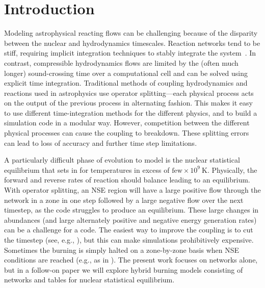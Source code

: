 \documentclass[linenumbers]{aastex631}
\begin{document}

\section{Introduction}\label{Sec:Introduction}

Modeling astrophysical reacting flows can be challenging because of
the disparity between the nuclear and hydrodynamics timescales.
Reaction networks tend to be stiff, requiring implicit integration
techniques to stably integrate the system~\citep{BYRNE19871}.  In contrast, compressible
hydrodynamics flows are limited by the (often much longer)
sound-crossing time over a computational cell and can be solved using
explicit time integration. Traditional methods of coupling
hydrodynamics and reactions used in astrophysics use operator
splitting---each physical process acts on the output of the previous
process in alternating fashion.  This makes it easy to use different
time-integration methods for the different physics, and to build a
simulation code in a modular way.  However, competition between the
different physical processes can cause the coupling to breakdown.
These splitting errors can lead to loss of accuracy and further time
step limitations.

A particularly difficult phase of evolution to model is the nuclear
statistical equilibrium that sets in for temperatures in excess of
$\mbox{few} \times 10^9~\mathrm{K}$.  Physically, the forward and
reverse rates of reaction should balance leading to an equilibrium.
With operator splitting, an NSE region will have a large positive flow
through the network in a zone in one step followed by a large negative
flow over the next timestep, as the code struggles to produce an
equilibrium. 
These large changes in abundances (and large alternately positive and negative energy generation rates) can be a challenge for
a code.  The easiest way to improve the coupling is to cut the
timestep (see, e.g., \citealt{couch:2015,rivas:2022}), but this can make simulations
prohibitively expensive.  Sometimes the burning is simply halted on a
zone-by-zone basis when NSE conditions are reached (e.g., as in
\citealt{hedet}).  The
present work focuses on networks alone, but in a follow-on paper we
will explore hybrid burning models consisting of networks and tables for
nuclear statistical equilibrium.
\end{document}
